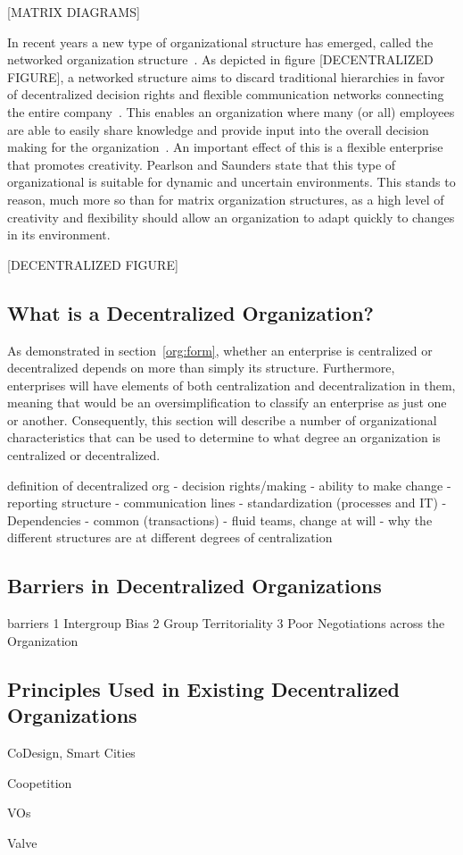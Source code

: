 [MATRIX DIAGRAMS]

In recent years a new type of organizational structure has emerged, called the networked organization structure~\cite{pearlson2009}. As depicted in figure [DECENTRALIZED FIGURE], a networked structure aims to discard traditional hierarchies in favor of decentralized decision rights and flexible communication networks connecting the entire company~\cite{applegate1988,pearlson2009}. This enables an organization where many (or all) employees are able to easily share knowledge and provide input into the overall decision making for the organization~\cite{pearlson2009}. An important effect of this is a flexible enterprise that promotes creativity. Pearlson and Saunders state that this type of organizational is suitable for dynamic and uncertain environments. This stands to reason, much more so than for matrix  organization structures, as a high level of creativity and flexibility should allow an organization to adapt quickly to changes in its environment. 

[DECENTRALIZED FIGURE]

\subsection{What is a Decentralized Organization?}

As demonstrated in section~\ref{org:form}, whether an enterprise is centralized or decentralized depends on more than simply its structure. Furthermore, enterprises will have elements of both centralization and decentralization in them, meaning that would be an oversimplification to classify an enterprise as just one or another. Consequently, this section will describe a number of organizational characteristics that can be used to determine to what degree an organization is centralized or decentralized. 


definition of decentralized org
    - decision rights/making
        - ability to make change
    - reporting structure
    - communication lines
    - standardization (processes and IT)
    - Dependencies - common (transactions)
    - fluid teams, change at will
    - why the different structures are at different degrees of centralization
    

\subsection{Barriers in Decentralized Organizations}

barriers
    1 Intergroup Bias
    2 Group Territoriality
    3 Poor Negotiations across the Organization

\subsection{Principles Used in Existing Decentralized Organizations}

CoDesign, Smart Cities

Coopetition

VOs

Valve
